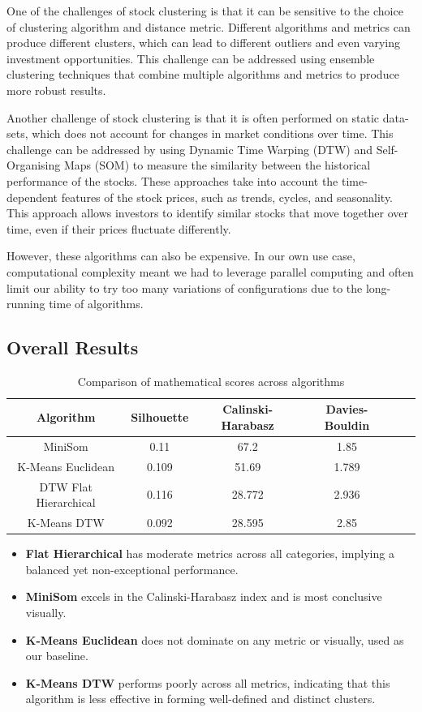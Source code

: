 \documentclass[11pt]{article}
\begin{document}
One of the challenges of stock clustering is that it can be sensitive to the choice of clustering algorithm and distance metric. Different algorithms and metrics can produce different clusters, which can lead to different outliers and even varying investment opportunities. This challenge can be addressed using ensemble clustering techniques that combine multiple algorithms and metrics to produce more robust results.

Another challenge of stock clustering is that it is often performed on static data-sets, which does not account for changes in market conditions over time. This challenge can be addressed by using Dynamic Time Warping (DTW) and Self-Organising Maps (SOM) to measure the similarity between the historical performance of the stocks. These approaches take into account the time-dependent features of the stock prices, such as trends, cycles, and seasonality. This approach allows investors to identify similar stocks that move together over time, even if their prices fluctuate differently.

However, these algorithms can also be expensive. In our own use case, computational complexity meant we had to leverage parallel computing and often limit our ability to try too many variations of configurations due to the long-running time of algorithms.

\subsection{Overall Results}


\begin{table}[H]
\centering
\begin{tabular}{|c|c|c|c|c|c|}
\hline
\textbf{Algorithm} & \textbf{Silhouette} & \textbf{Calinski-Harabasz} & \textbf{Davies-Bouldin} \\
\hline
MiniSom & 0.11 & 67.2 & 1.85 \\
K-Means Euclidean & 0.109 & 51.69 & 1.789 \\
DTW Flat Hierarchical & 0.116  & 28.772 & 2.936 \\
K-Means DTW & 0.092 & 28.595 & 2.85\\
\hline
\end{tabular}
\caption{Comparison of mathematical scores across algorithms}
\label{tab:comparison_score}
\end{table}



\begin{itemize}
    \item \textbf{Flat Hierarchical} has moderate metrics across all categories, implying a balanced yet non-exceptional performance.
    \item \textbf{MiniSom} excels in the Calinski-Harabasz index and is most conclusive visually.
    \item \textbf{K-Means Euclidean} does not dominate on any metric or visually, used as our baseline.
    \item \textbf{K-Means DTW} performs poorly across all metrics, indicating that this algorithm is less effective in forming well-defined and distinct clusters.
\end{itemize}
\end{document}
